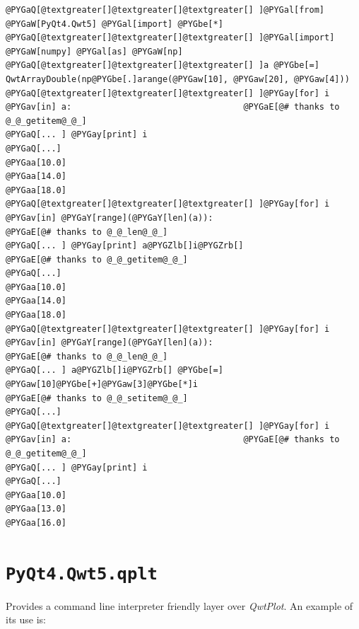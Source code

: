 \documentclass[a4paper,10pt,english]{manual}
\begin{document}
\begin{Verbatim}[commandchars=@\[\]]
@PYGaQ[@textgreater[]@textgreater[]@textgreater[] ]@PYGal[from] @PYGaW[PyQt4.Qwt5] @PYGal[import] @PYGbe[*]
@PYGaQ[@textgreater[]@textgreater[]@textgreater[] ]@PYGal[import] @PYGaW[numpy] @PYGal[as] @PYGaW[np]
@PYGaQ[@textgreater[]@textgreater[]@textgreater[] ]a @PYGbe[=] QwtArrayDouble(np@PYGbe[.]arange(@PYGaw[10], @PYGaw[20], @PYGaw[4]))
@PYGaQ[@textgreater[]@textgreater[]@textgreater[] ]@PYGay[for] i @PYGav[in] a:                                  @PYGaE[@# thanks to @_@_getitem@_@_]
@PYGaQ[... ] @PYGay[print] i
@PYGaQ[...]
@PYGaa[10.0]
@PYGaa[14.0]
@PYGaa[18.0]
@PYGaQ[@textgreater[]@textgreater[]@textgreater[] ]@PYGay[for] i @PYGav[in] @PYGaY[range](@PYGaY[len](a)):                      @PYGaE[@# thanks to @_@_len@_@_]
@PYGaQ[... ] @PYGay[print] a@PYGZlb[]i@PYGZrb[]                                  @PYGaE[@# thanks to @_@_getitem@_@_]
@PYGaQ[...]
@PYGaa[10.0]
@PYGaa[14.0]
@PYGaa[18.0]
@PYGaQ[@textgreater[]@textgreater[]@textgreater[] ]@PYGay[for] i @PYGav[in] @PYGaY[range](@PYGaY[len](a)):                      @PYGaE[@# thanks to @_@_len@_@_]
@PYGaQ[... ] a@PYGZlb[]i@PYGZrb[] @PYGbe[=] @PYGaw[10]@PYGbe[+]@PYGaw[3]@PYGbe[*]i                               @PYGaE[@# thanks to @_@_setitem@_@_]
@PYGaQ[...]
@PYGaQ[@textgreater[]@textgreater[]@textgreater[] ]@PYGay[for] i @PYGav[in] a:                                  @PYGaE[@# thanks to @_@_getitem@_@_]
@PYGaQ[... ] @PYGay[print] i
@PYGaQ[...]
@PYGaa[10.0]
@PYGaa[13.0]
@PYGaa[16.0]
\end{Verbatim}


\section{\texttt{PyQt4.Qwt5.qplt}}
\hypertarget{module-PyQt4.Qwt5.qplt}{}
\modulesynopsis{}
Provides a command line interpreter friendly layer over \emph{QwtPlot}.
An example of its use is:
\end{document}
